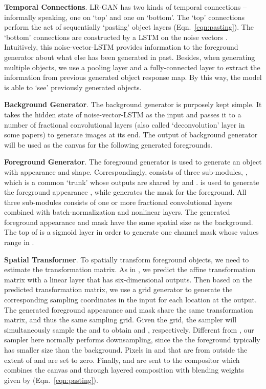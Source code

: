 \documentclass{article} \usepackage{iclr2017_conference,times}
\begin{document}
\textbf{Temporal Connections}.  
LR-GAN has two kinds of temporal connections -- informally speaking, one on `top' and one on `bottom'. The `top' connections perform the act of sequentially `pasting' object layers (Eqn.~\ref{eqn:pasting}). The `bottom' connections are constructed by a LSTM on the noise vectors . Intuitively, this noise-vector-LSTM provides information to the foreground generator about what else has been generated in past. Besides, when generating multiple objects, we use a pooling layer  and a fully-connected layer  to extract the information from previous generated object response map. By this way, the model is able to `see' previously generated objects.

\textbf{Background Generator}. The background generator  is purposely kept simple. 
It takes the hidden state of noise-vector-LSTM  as the input and passes it to a number of fractional convolutional layers (also called `deconvolution' layer in some papers) to generate images at its end. The output of background generator  will be used as the canvas for the following generated foregrounds.

\textbf{Foreground Generator}. The foreground generator  is used to generate an object with appearance and shape. Correspondingly,  consists of three sub-modules, , which is a common `trunk' whose outputs are shared by  and .  is used to generate the foreground appearance , while  generates the mask  for the foreground. All three sub-modules consists of one or more fractional convolutional layers combined with batch-normalization and nonlinear layers. The generated foreground appearance and mask have the same spatial size as the background. The top of  is a sigmoid layer in order to generate one channel mask whose values range in .

\textbf{Spatial Transformer}. To spatially transform foreground objects, 
we need to estimate the transformation matrix. As in \cite{STN}, we predict the affine transformation matrix with a linear layer  that has six-dimensional outputs. 
Then based on the predicted transformation matrix, we use a grid generator  to generate the corresponding sampling coordinates in the input for each location at the output. 
The generated foreground appearance and mask share the same transformation matrix, and thus the same sampling grid. Given the grid, the sampler  will simultaneously sample the  and  to obtain  and , respectively. Different from \cite{STN}, our sampler here normally performs downsampling, since the the foreground typically has smaller size than the background. Pixels in  and  that are from outside the extent of  and  are set to zero. Finally,  and  are sent to the compositor  which combines the canvas  and  through layered composition with blending weights given by  (Eqn.~\ref{eqn:pasting}).
\end{document}
